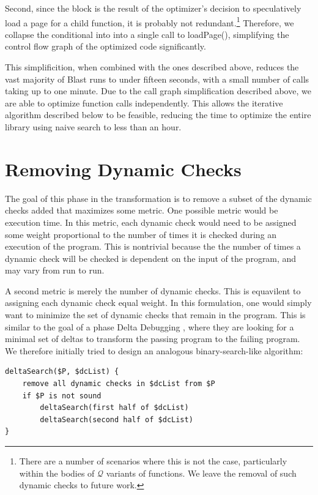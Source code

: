\documentclass[10pt,letterpaper,twocolumn,english]{article}
\newcommand{\pin}{loadPage()\xspace}
\newcommand{\fQ}{{$\mathcal Q$}\xspace}
\begin{document}
Second, since the block is the result of the optimizer's decision to
speculatively load a page for a child function, it is probably not
redundant.\footnote{There are a number of scenarios where this is not
the case, particularly within the bodies of \fQ variants of functions.
We leave the removal of such dynamic checks to future work.}
Therefore, we collapse the conditional into into a single call to
\pin, simplifying the control flow graph of the optimized code
significantly.  

This simplificition, when combined with the ones described above,
reduces the vast majority of Blast runs to under fifteen seconds, with
a small number of calls taking up to one minute.  Due to the call graph
simplification described above, we are able to optimize function calls
independently.  This allows the iterative algorithm described below to
be feasible, reducing the time to optimize the entire library using
naive search to less than an hour.

\section{Removing Dynamic Checks}
\label{delta}
The goal of this phase in the transformation is to remove a subset of
the dynamic checks added that maximizes some metric.  One possible
metric would be execution time.  In this metric, each dynamic check
would need to be assigned some weight proportional to the number of
times it is checked during an execution of the program.  This is
nontrivial because the the number of times a dynamic check will be
checked is dependent on the input of the program, and may vary from run
to run. 

A second metric is merely the number of dynamic checks.  This is
equavilent to assigning each dynamic check equal weight.  In this
formulation, one would simply want to minimize the set of dynamic checks
that remain in the program.  This is similar to the goal of a phase
Delta Debugging \cite{deltaDebugging}, where they are looking for a
minimal set of deltas to transform the passing program to the failing
program.  We therefore initially tried to design an analogous
binary-search-like algorithm:

\begin{verbatim}
deltaSearch($P, $dcList) {
	remove all dynamic checks in $dcList from $P
	if $P is not sound
		deltaSearch(first half of $dcList)
		deltaSearch(second half of $dcList)
}
\end{verbatim}
\end{document}
